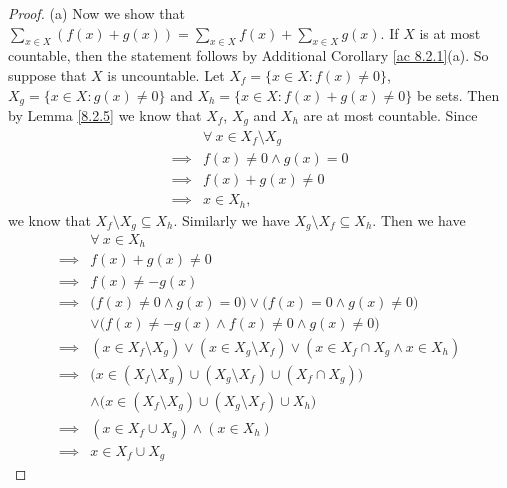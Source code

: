 \begin{proof}{(a)}
    Now we show that \(\sum_{x \in X} (f(x) + g(x)) = \sum_{x \in X} f(x) + \sum_{x \in X} g(x)\).
    If \(X\) is at most countable, then the statement follows by Additional Corollary \ref{ac 8.2.1}(a).
    So suppose that \(X\) is uncountable.
    Let \(X_f = \{x \in X : f(x) \neq 0\}\), \(X_g = \{x \in X : g(x) \neq 0\}\) and \(X_h = \{x \in X : f(x) + g(x) \neq 0\}\) be sets.
    Then by Lemma \ref{8.2.5} we know that \(X_f\), \(X_g\) and \(X_h\) are at most countable.
    Since
    \begin{align*}
                 & \forall\ x \in X_f \setminus X_g \\
        \implies & f(x) \neq 0 \land g(x) = 0       \\
        \implies & f(x) + g(x) \neq 0               \\
        \implies & x \in X_h,
    \end{align*}
    we know that \(X_f \setminus X_g \subseteq X_h\).
    Similarly we have \(X_g \setminus X_f \subseteq X_h\).
    Then we have
    \begin{align*}
                 & \forall\ x \in X_h                                                                                 \\
        \implies & f(x) + g(x) \neq 0                                                                                 \\
        \implies & f(x) \neq -g(x)                                                                                    \\
        \implies & \big(f(x) \neq 0 \land g(x) = 0\big) \lor \big(f(x) = 0 \land g(x) \neq 0\big)                     \\
                 & \lor \big(f(x) \neq -g(x) \land f(x) \neq 0 \land g(x) \neq 0\big)                                 \\
        \implies & (x \in X_f \setminus X_g) \lor (x \in X_g \setminus X_f) \lor (x \in X_f \cap X_g \land x \in X_h) \\
        \implies & \big(x \in (X_f \setminus X_g) \cup (X_g \setminus X_f) \cup (X_f \cap X_g)\big)                   \\
                 & \land \big(x \in (X_f \setminus X_g) \cup (X_g \setminus X_f) \cup X_h\big)                        \\
        \implies & (x \in X_f \cup X_g) \land (x \in X_h)                                                             \\
        \implies & x \in X_f \cup X_g
    \end{align*}

\end{proof}
